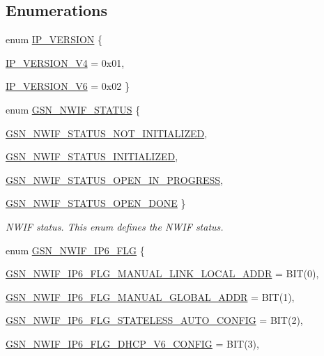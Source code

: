 \subsection*{Enumerations}
\begin{DoxyCompactItemize}
\item 
enum \hyperlink{a00534_abf9adb0cafd6914964a2ccab114e4bfe}{IP\_\-VERSION} \{ \par
\hyperlink{a00534_abf9adb0cafd6914964a2ccab114e4bfea34109b1e0b5d00e2a85bcb1348684a2a}{IP\_\-VERSION\_\-V4} = 0x01, 
\par
\hyperlink{a00534_abf9adb0cafd6914964a2ccab114e4bfea494a716dab2d9239bb991db0a32c287c}{IP\_\-VERSION\_\-V6} = 0x02
 \}
\item 
enum \hyperlink{a00670_ga6831d8e94870e58c8ba6de3fd14e829d}{GSN\_\-NWIF\_\-STATUS} \{ \par
\hyperlink{a00670_gga6831d8e94870e58c8ba6de3fd14e829dab86b0ac682d8405ae1ab5f27193b5f8c}{GSN\_\-NWIF\_\-STATUS\_\-NOT\_\-INITIALIZED}, 
\par
\hyperlink{a00670_gga6831d8e94870e58c8ba6de3fd14e829dab64258dc583468badc6b259d23e29a3b}{GSN\_\-NWIF\_\-STATUS\_\-INITIALIZED}, 
\par
\hyperlink{a00670_gga6831d8e94870e58c8ba6de3fd14e829daf1dad44940ad39f72a1b4e8e32cfc57a}{GSN\_\-NWIF\_\-STATUS\_\-OPEN\_\-IN\_\-PROGRESS}, 
\par
\hyperlink{a00670_gga6831d8e94870e58c8ba6de3fd14e829da00983344dccba515ab60c8b49d08e99a}{GSN\_\-NWIF\_\-STATUS\_\-OPEN\_\-DONE}
 \}
\begin{DoxyCompactList}\small\item\em NWIF status. This enum defines the NWIF status. \end{DoxyCompactList}\item 
enum \hyperlink{a00670_ga283a80240d803667a00eb79d19d53fd6}{GSN\_\-NWIF\_\-IP6\_\-FLG} \{ \par
\hyperlink{a00670_gga283a80240d803667a00eb79d19d53fd6a996c32a475b164cb2153706931f80fa1}{GSN\_\-NWIF\_\-IP6\_\-FLG\_\-MANUAL\_\-LINK\_\-LOCAL\_\-ADDR} =  BIT(0), 
\par
\hyperlink{a00670_gga283a80240d803667a00eb79d19d53fd6a6c066705f0add82f314cdeda98179b58}{GSN\_\-NWIF\_\-IP6\_\-FLG\_\-MANUAL\_\-GLOBAL\_\-ADDR} =  BIT(1), 
\par
\hyperlink{a00670_gga283a80240d803667a00eb79d19d53fd6a5cfda1f3737e1d1d7aa79b8b821ba5fc}{GSN\_\-NWIF\_\-IP6\_\-FLG\_\-STATELESS\_\-AUTO\_\-CONFIG} =  BIT(2), 
\par
\hyperlink{a00670_gga283a80240d803667a00eb79d19d53fd6a8d099635d50df7a353bde782e0d3b0c5}{GSN\_\-NWIF\_\-IP6\_\-FLG\_\-DHCP\_\-V6\_\-CONFIG} =  BIT(3), 

\end{DoxyCompactItemize}
